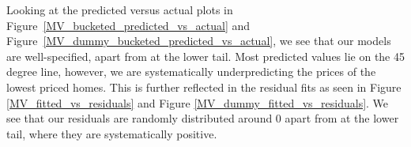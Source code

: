 Looking at the predicted versus actual plots in Figure~\ref{MV_bucketed_predicted_vs_actual} and Figure~\ref{MV_dummy_bucketed_predicted_vs_actual}, we see that our models are well-specified, apart from at the lower tail.
Most predicted values lie on the 45 degree line, however, we are systematically underpredicting the prices of the lowest priced homes. This is further reflected in the residual fits
as seen in Figure \ref{MV_fitted_vs_residuals} and Figure \ref{MV_dummy_fitted_vs_residuals}. We see that our residuals are randomly distributed around 0 apart from at the lower tail, where they are systematically positive.